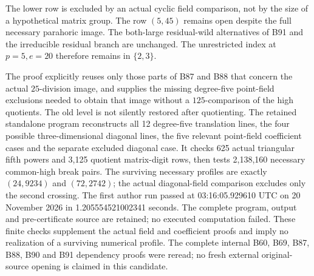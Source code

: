 \begin{remark}
\label{rem:B-RD92-scope}
The lower row is excluded by an actual cyclic field comparison,
not by the size of a hypothetical matrix group. The row \((5,45)\)
remains open despite the full necessary parahoric image. The
both-large residual-wild alternatives of B91 and the irreducible
residual branch are unchanged. The unrestricted index at
\(p=5,e=20\) therefore remains in \(\{2,3\}\).

The proof explicitly reuses only those parts of B87 and B88 that
concern the actual \(25\)-division image, and supplies the missing
degree-five point-field exclusions needed to obtain that image
without a \(125\)-comparison of the high quotients. The old level
is not silently restored after quotienting. The retained standalone
program 
reconstructs all 12 degree-five translation lines, the four possible
three-dimensional diagonal lines, the five relevant point-field
coefficient cases and the separate excluded diagonal case. It checks
625 actual triangular fifth powers and 3,125 quotient matrix-digit
rows, then tests 2,138,160 necessary common-high break pairs. The
surviving necessary profiles are exactly \((24,9234)\) and
\((72,2742)\); the actual diagonal-field comparison excludes only
the second crossing. The first author run passed at
03:16:05.929610 UTC on 20 November 2026 in
1.205554521002341 seconds. The complete program, output and
pre-certificate source are retained; no executed computation failed.
These finite checks supplement the actual field and coefficient
proofs and imply no realization of a surviving numerical profile.
The complete internal B60, B69, B87, B88, B90 and B91 dependency
proofs were reread; no fresh external original-source opening is
claimed in this candidate.
\end{remark}
